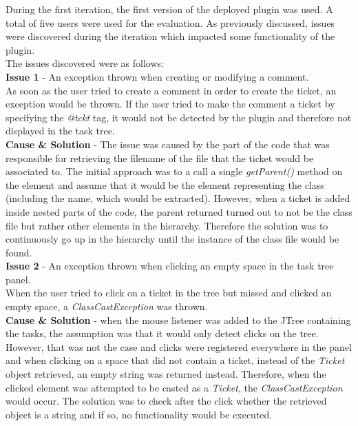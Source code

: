\documentclass{4thYearProject}
\begin{document}
During the first iteration, the first version of the deployed plugin was used. A total of five users were used for the evaluation. As previously discussed, issues were discovered during the iteration which impacted some functionality of the plugin. \\
\newline
The issues discovered were as follows:\\
\newline
\textbf{Issue 1} - An exception thrown when creating or modifying a comment.\\
\newline
As soon as the user tried to create a comment in order to create the ticket, an exception would be thrown. If the user tried to make the comment a ticket by specifying the \textit{@tckt} tag, it would not be detected by the plugin and therefore not displayed in the task tree.\\   
\newline
\textbf{Cause \& Solution} - The issue was caused by the part of the code that was responsible for retrieving the filename of the file that the ticket would be associated to. The initial approach was to a call a single \textit{getParent()} method on the element and assume that it would be the element representing the class (including the name, which would be extracted). However, when a ticket is added inside nested parts of the code, the parent returned turned out to not be the class file but rather other elements in the hierarchy. Therefore the solution was to continuously go up in the hierarchy until the instance of the class file would be found.\\ 
\newline
\textbf{Issue 2} - An exception thrown when clicking an empty space in the task tree panel.\\
\newline
When the user tried to click on a ticket in the tree but missed and clicked an empty space, a \textit{ClassCastException} was thrown.\\
\newline
\textbf{Cause \& Solution} - when the mouse listener was added to the JTree containing the tasks, the assumption was that it would only detect clicks on the tree. However, that was not the case and clicks were registered everywhere in the panel and when clicking on a space that did not contain a ticket, instead of the \textit{Ticket} object retrieved, an empty string was returned instead. Therefore, when the clicked element was attempted to be casted as a \textit{Ticket}, the \textit{ClassCastException} would occur. The solution was to check after the click whether the retrieved object is a string and if so, no functionality would be executed. 
\end{document}
